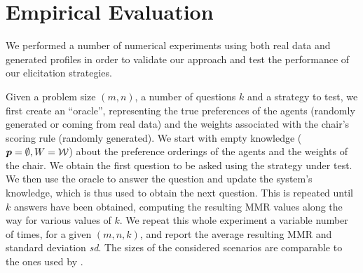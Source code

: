 \documentclass{article}
\begin{document}

\section{Empirical Evaluation} 
\label{sec:experiments}
We  performed a number of numerical experiments using both real data and generated profiles in order to validate our approach and test the performance of our elicitation strategies. %

Given a problem size $(m, n)$, a number of questions $k$ and a strategy to test, we first create an “oracle”, representing the true preferences of the agents (randomly generated or coming from real data) and the weights associated with the chair’s scoring rule (randomly generated).
We start with empty knowledge (${\bm{p}} = \emptyset, W = \mathcal{W}$) about the preference orderings of the agents and the weights %
of the chair. We obtain the first question to be asked using the strategy under test. We then use the oracle to answer the question and update the system's knowledge, which is thus used to obtain the next question. This is repeated until $k$ answers have been obtained, computing the resulting MMR values along the way for various values of $k$. We repeat this whole experiment a variable number of times, for a given $(m, n, k)$, and report the average resulting MMR and standard deviation \textit{sd}. The sizes of the considered scenarios are comparable to the ones used by \citet{Cailloux2014}. 
\end{document}
